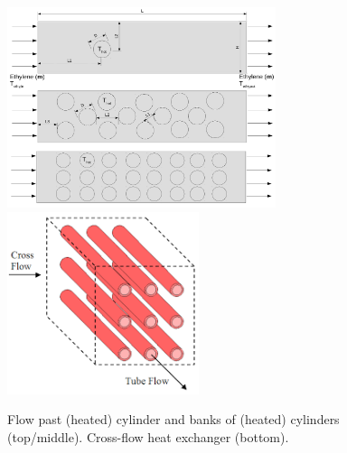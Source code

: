 \documentclass[12pts,a4paper,amsmath,amssymb,floatfix]{article}%
\begin{document}
     \begin{figure}[h]
         \vbox{ \hbox{\hspace{1cm}\includegraphics[width=0.7\textwidth,clip]{./Pics/HeatExchanger_2D.pdf}}
                \hbox{\hspace{3cm}\includegraphics[width=0.5\textwidth,clip]{./Pics/HE_Finned.png}}}
         \caption{Flow past (heated) cylinder and banks of (heated) cylinders (top/middle). Cross-flow heat exchanger (bottom). }\label{HE_FlowPastHeatedCyclinder}
     \end{figure}
\end{document}
